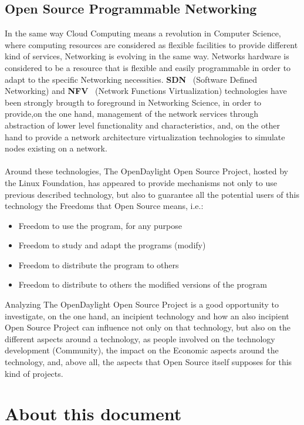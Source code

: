 \documentclass[a4paper, 12pt]{book}
\begin{document}
\subsection{Open Source Programmable Networking}
\label{subsec:freesoftware}
In the same way Cloud Computing means a revolution in Computer Science, where computing resources are considered as flexible facilities to provide different kind of services, Networking is evolving in the same way. Networks hardware is considered to be a resource that is flexible and easily programmable in order to adapt to the specific Networking necessities. \textbf{SDN}~\cite{OpenNetworkingSDNDefinition} (Software Defined Networking) and \textbf{NFV}~\cite{ETSINFVDefinition} (Network Functions Virtualization) technologies have been strongly brougth to foreground in Networking Science, in order to provide,on the one hand, management of the network services through abstraction of lower level functionality and characteristics, and, on the other hand to provide a network architecture virtualization technologies to simulate nodes existing on a network.\\
\\
Around these technologies, The OpenDaylight Open Source Project, hosted by the Linux Foundation, has appeared to provide mechanisms not only to use previous described technology, but also to guarantee all the potential users of this technology the Freedoms that Open Source means, i.e.:
\begin{itemize}
 \item Freedom to use the program, for any purpose
 \item Freedom to study and adapt the programs (modify)
 \item Freedom to distribute the program to others
 \item Freedom to distribute to others the modified versions of the program
\end{itemize}
Analyzing The OpenDaylight Open Source Project is a good opportunity to investigate, on the one hand, an incipient technology and how an also incipient Open Source Project can influence not only on that technology, but also on the different aspects around a technology, as people involved on the technology development (Community), the impact on the Economic aspects around the technology, and, above all, the aspects that Open Source itself supposes for this kind of projects.

\section{About this document}
\label{sec:about}
\end{document}
